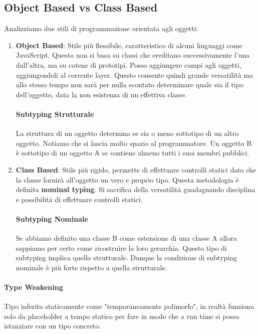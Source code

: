\documentclass{article}
\begin{document}
\newpage

\subsection{Object Based vs Class Based}

Analizziamo due stili di programmazione orientata agli oggetti:

\begin{enumerate}
    \item \textbf{Object Based}: Stile più flessibile, caratteristico di alcuni linguaggi come JavaScript. Questo non si basa su classi che ereditano successivamente l'una dall'altra, ma su catene di prototipi. Posso aggiungere campi agli oggetti, aggiungendoli al corrente layer. Questo consente quindi grande versatilità ma allo stesso tempo non sarà per nulla scontato determinare quale sia il tipo dell'oggetto, data la non esistenza di un effettiva classe.

    \paragraph{Subtyping Strutturale} La struttura di un oggetto determina se sia o meno sottotipo di un altro oggetto. Notiamo che si lascia molto spazio al programmatore. Un oggetto B è sottotipo di un oggetto A se contiene almeno tutti i suoi membri pubblici.

    \vspace*{15px}
    
    \item \textbf{Class Based}: Stile più rigido, permette di effettuare controlli statici dato che la classe fornirà all'oggetto un vero e proprio tipo. Questa metodologia è definita \textbf{nominal typing}. Si sacrifica della versatilità guadagnando disciplina e possibilità di effettuare controlli statici.

    \paragraph{Subtyping Nominale} Se abbiamo definito una classe B come estensione di una classe A allora sappiamo per certo come ricostruire la loro gerarchia. Questo tipo di subtyping implica quello strutturale. Dunque la condizione di subtyping nominale è più forte rispetto a quella strutturale.
\end{enumerate}

\paragraph{Type Weakening} Tipo inferito staticamente come "temporaneamente polimorfo", in realtà funziona solo da placeholder a tempo statico per fare in modo che a run time si possa istanziare con un tipo concreto.
\end{document}
